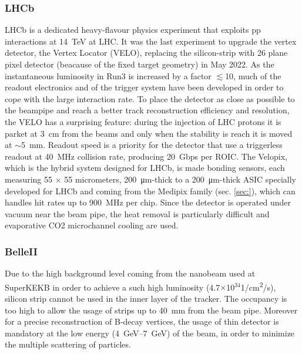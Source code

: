         \subsubsection{LHCb}
        LHCb is a dedicated heavy-flavour physics experiment that exploits pp interactions at \SI{14}{TeV} at LHC. 
        It was the last experiment to upgrade the vertex detector, the Vertex Locator (VELO), replacing the silicon-strip with 26 plane pixel detector (beacause of the fixed target geometry) in May 2022. 
        As the instantaneous luminosity in Run3 is increased by a factor $\lesssim$10, much of the readout electronics and of the trigger system have been developed in order to cope with the large interaction rate.
        To place the detector as close as possible to the beampipe and reach a better track reconstruction efficiency and resolution, the VELO has a surprising feature: during the injection of LHC protons it is parket at \SI{3}{cm} from the beams and only when the stability is reach it is moved at $\sim$\SI{5}{mm}. Readout speed is a priority for the detector that use a triggerless readout at \SI{40}{MHz} collision rate, producing \SI{20}{Gbps} per ROIC. 
        The Velopix, which is the hybrid system designed for LHCb, is made bonding sensors, each measuring 55 $\times$ 55 micrometers, \SI{200}{\um}-thick to a \SI{200}{\um}-thick ASIC specially developed for LHCb and coming from the Medipix family (sec. \ref{sec:}), which can handles hit rates up to \SI{900}{MHz} per chip. 
        Since the detector is operated under vacuum near the beam pipe, the heat removal is particularly difficult and evaporative CO2 microchannel cooling are used. 

    \subsubsection{BelleII}
        Due to the high background level coming from the nanobeam used at SuperKEKB in order to achieve a such high luminosity (4.7$\times$10$^{34}$\si{1/cm\squared/s}), silicon strip cannot be used in the inner layer of the tracker. The occupancy is too high to allow the usage of strips up to \SI{40}{mm} from the beam pipe. 
        Moreover for a precise reconstruction of B-decay vertices, the usage of thin detector is mandatory at the low energy (\SIrange{4}{7}{GeV}) of the beam, in order to minimize the multiple scattering of particles. 
 
